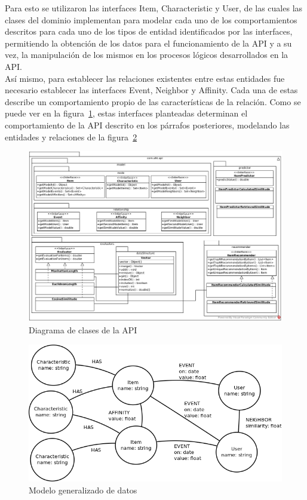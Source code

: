 Para esto se utilizaron las interfaces Item, Characteristic y User, de las cuales las clases del dominio implementan para modelar cada uno de los comportamientos descritos para cada uno de los tipos de entidad identificados por las interfaces, permitiendo la obtención de los datos para el funcionamiento de la API y a su vez, la manipulación de los mismos en los procesos lógicos desarrollados en la API.\\

Así mismo, para establecer las relaciones existentes entre estas entidades fue necesario establecer las interfaces Event, Neighbor y Affinity. Cada una de estas describe un comportamiento propio de las características de la relación. Como se puede ver en la figura~\ref{fig:p3_interfaces}, estas interfaces planteadas determinan el comportamiento de la API descrito en los párrafos posteriores, modelando las entidades y relaciones de la figura~\ref{fig:p3_general_model}

\begin{landscape}
	\begin{figure}[h!]
		\centering
		\includegraphics[width=24cm]{./images/classes_api}
		\caption{Diagrama de clases de la API}
		\label{fig:p3_interfaces}
	\end{figure}
\end{landscape}

\begin{figure}[h!]
	\centering
	\includegraphics[width=16cm]{./images/general_data_model}
	\caption{Modelo generalizado de datos}
	\label{fig:p3_general_model}
\end{figure}

